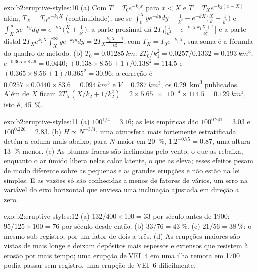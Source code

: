 \begin{solution}{exo:b2:eruptive-styles:10}
(a) Com $T = T_0e^{-k_1x}$ para $x < X$ e $T = T_Xe^{-k_2(x - X)}$ além, $T_X =
T_0e^{-k_1X}$ (continuidade), use-se $\int_0^X ye^{-ky}dy = \frac{1}{k^2} - e^{-kX}\big(\frac{X}{k} +
\frac{1}{k^2}\big)$ e $\int_X^\infty ye^{-ky}dy = e^{-kX}\big(\frac{X}{k} +
\frac{1}{k^2}\big)$:
a parte proximal dá $2T_0\big[\frac{1}{k_1^2} - e^{-k_1X}\frac{k_1X + 1}{k_1^2}\big]$ e a
parte distal $2T_Xe^{k_2X}\int_X^\infty ye^{-k_2y}dy = 2T_X\frac{k_2X + 1}{k_2^2}$; com $T_X =
T_0e^{-k_1X}$, sua soma é a fórmula do quadro de método.
(b) $T_0 = \qty{0.01285}{km}$: $2T_0/k_1^2 = 0.0257/0.1332 = \qty{0.193}{km^3}$;
$e^{-0.365\times8.56} = 0.0440$; $(0.138\times8.56 + 1)/0.138^2 = 114.5$ e
$(0.365\times8.56 + 1)/0.365^2 = 30.96$; a correção é $0.0257\times0.0440\times83.6
= \qty{0.094}{km^3}$ e $V = \qty{0.287}{km^3}$, os \qty{0.29}{km^3} publicados.
Além de $X$ ficam $2T_X(X/k_2 + 1/k_2^2) = 2\times\num{5.65e-4}\times114.5 =
\qty{0.129}{km^3}$, isto é, \qty{45}{\percent}.
\end{solution}

\begin{solution}{exo:b2:eruptive-styles:11}
(a) $100^{1/4} = 3.16$; as leis empíricas dão $100^{0.241} = 3.03$ e
$100^{0.226} = 2.83$. (b) $H \propto N^{-3/4}$: uma atmosfera mais fortemente estratificada
detém a coluna mais abaixo; para $N$ maior em \qty{20}{\percent},
$1.2^{-0.75} = 0.87$, uma altura \qty{13}{\percent} menor. (c) As plumas fracas são
inclinadas pelo vento, o que as rebaixa, enquanto o ar úmido libera nelas calor latente,
o que as eleva; esses efeitos pesam de modo diferente sobre as pequenas e as grandes
erupções e não estão na lei simples. E as vazões só são conhecidas a menos de
fatores de vários, um erro na variável do eixo horizontal que enviesa
uma inclinação ajustada em direção a zero.
\end{solution}

\begin{solution}{exo:b2:eruptive-styles:12}
(a) $132/400\times100 = 33$ por século antes de 1900; $95/125\times100 = 76$ por
século desde então. (b) $33/76 = \qty{43}{\percent}$. (c) $21/56 = \qty{38}{\percent}$:
o mesmo sub-registro, por um fator de dois a três. (d) As erupções maiores são
vistas de mais longe e deixam depósitos mais espessos e extensos que resistem à erosão
por mais tempo; uma erupção de VEI~4 em uma ilha remota em 1700 podia passar sem registro, uma
erupção de VEI~6 dificilmente.
\end{solution}

